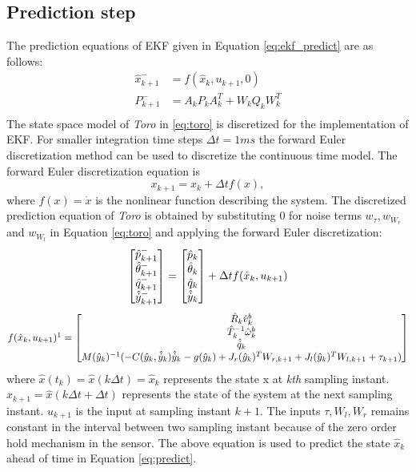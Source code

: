 \subsection{Prediction step}
\label{subsec:toro_predict}
The prediction equations of EKF given in Equation \ref{eq:ekf_predict} are as follows:
\begin{equation}
\label{eq:predict}
\begin{split}
\hat{x}_{k+1}^- &= f(\hat{x}_{k},u_{k+1},0)\\
P_{k+1}^- &= A_kP_{k}A_k^T + W_kQ_{k}W_k^T \\
\end{split}
\end{equation}
The state space model of \emph{Toro} in \ref{eq:toro} is discretized for the implementation of EKF. For smaller integration time steps $\Delta t = 1ms$ the forward Euler discretization method can be used to discretize the continuous time model. The forward Euler discretization equation is $$ x_{k+1} = x_k + \Delta t f(x),$$ where $f(x)=\dot x$ is the nonlinear function describing the system. The discretized prediction equation of \emph{Toro} is obtained by substituting $0$ for noise terms $w_\tau, w_{W_r}$ and $w_{W_l}$ in Equation \ref{eq:toro} and applying the forward Euler discretization:
\begin{equation}
\label{eq:toro_dis}
	\begin{bmatrix}
	\hat{p}_{k+1}^- \\ \hat{\theta}_{k+1}^- \\ \hat{q}_{k+1}^- \\ \hat{\dot{y}}_{k+1}^-
	\end{bmatrix}
	 =   
	 \begin{bmatrix}
	 \hat{p}_k \\ \hat{\theta}_k \\ \hat{q}_k \\ \hat{\dot{y}}_{k}
	\end{bmatrix}	  
	+ \Delta t f(\hat{x}_k,u_{k+1}) \\
\end{equation}
$$ f(\hat{x}_k,u_{k+1})\footnotemark[1] = 
	\begin{bmatrix}
	\hat R_k \hat v^b_k \\
	\hat T_k^{-1} \hat \omega_k^b  \\
	\hat{\dot{q}}_k\\
	M(\hat{y}_{k})^{-1}(-C(\hat{y}_{k},\hat{\dot{y}}_{k})\hat{\dot{y}}_{k} -g(\hat{y}_{k}) +  J_r(\hat{y}_{k})^{T}W_{r,k+1} +J_l(\hat{y}_{k})^{T}W_{l,k+1} + \tau_{k+1})	
	\end{bmatrix}  $$
where $\hat{x}(t_k) = \hat{x}(k \Delta t) = \hat{x}_k$ represents the state x at \emph{kth} sampling instant. $\hat{x}_{k+1} = \hat{x}(k \Delta t + \Delta t)$ represents the state of the system at the next sampling instant. $u_{k+1}$ is the input at sampling instant $k+1$. The inputs $\tau, W_l, W_r$ remains constant in the interval between two sampling instant because of the zero order hold mechanism in the sensor. The above equation is used to predict the state $\hat{x}_k$ ahead of time in Equation \ref{eq:predict}. 

